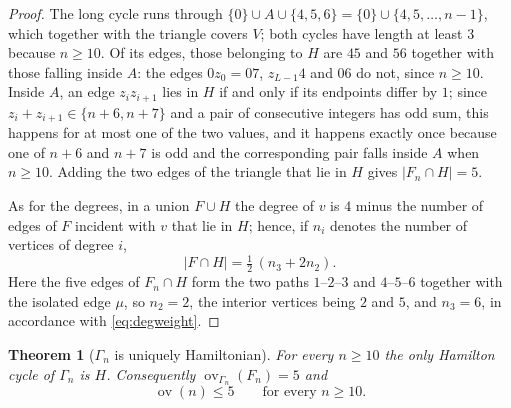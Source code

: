 \documentclass[11pt,a4paper]{article}
\newtheorem{theorem}{Theorem}[section]
\theoremstyle{definition}
\theoremstyle{remark}
\newcommand{\ov}{\operatorname{ov}}
\begin{document}
\begin{proof}
The long cycle runs through $\{0\}\cup A\cup\{4,5,6\}=\{0\}\cup\{4,5,\dots,n-1\}$, which together with the triangle covers $V$; both cycles have length at least $3$ because $n\ge10$. Of its edges, those belonging to $H$ are $45$ and $56$ together with those falling inside $A$: the edges $0z_0=07$, $z_{L-1}4$ and $06$ do not, since $n\ge10$. Inside $A$, an edge $z_iz_{i+1}$ lies in $H$ if and only if its endpoints differ by $1$; since $z_i+z_{i+1}\in\{n+6,n+7\}$ and a pair of consecutive integers has odd sum, this happens for at most one of the two values, and it happens exactly once because one of $n+6$ and $n+7$ is odd and the corresponding pair falls inside $A$ when $n\ge10$. Adding the two edges of the triangle that lie in $H$ gives $|F_n\cap H|=5$.

As for the degrees, in a union $F\cup H$ the degree of $v$ is $4$ minus the number of edges of $F$ incident with $v$ that lie in $H$; hence, if $n_i$ denotes the number of vertices of degree $i$,
\begin{equation}\label{eq:degweight}
|F\cap H|=\tfrac12\,(n_3+2n_2).
\end{equation}
Here the five edges of $F_n\cap H$ form the two paths $1$--$2$--$3$ and $4$--$5$--$6$ together with the isolated edge $\mu$, so $n_2=2$, the interior vertices being $2$ and $5$, and $n_3=6$, in accordance with \eqref{eq:degweight}.
\end{proof}

\begin{theorem}[$\Gamma_n$ is uniquely Hamiltonian]\label{thm:gamma}
For every $n\ge10$ the only Hamilton cycle of $\Gamma_n$ is $H$. Consequently $\ov_{\Gamma_n}(F_n)=5$ and
\[
\ov(n)\le5\qquad\text{for every }n\ge10 .
\]
\end{theorem}
\end{document}

